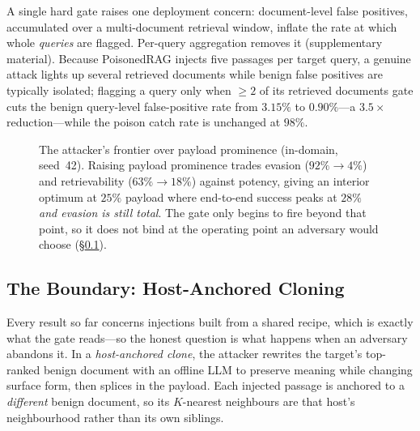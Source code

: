\documentclass[conference]{IEEEtran}
\begin{document}
A single hard gate raises one deployment concern: document-level false positives,
accumulated over a multi-document retrieval window, inflate the rate at which whole
\emph{queries} are flagged. Per-query aggregation removes it (supplementary material).
Because PoisonedRAG injects five passages per target query, a genuine
attack lights up several retrieved documents while benign false positives are
typically isolated; flagging a query only when $\geq\!2$ of its retrieved documents
gate cuts the benign query-level false-positive rate from $3.15\%$ to
$0.90\%$---a $3.5\times$ reduction---while the poison catch rate is unchanged at
$98\%$.

\begin{figure}[t]
\centering
{}
\caption{The attacker's frontier over payload prominence (in-domain, seed~42). Raising payload
prominence trades evasion ($92\%\!\to\!4\%$) and retrievability ($63\%\!\to\!18\%$) against
potency, giving an interior optimum at $25\%$ payload where end-to-end success peaks at $28\%$
\emph{and evasion is still total}. The gate only begins to fire beyond that point, so it does
not bind at the operating point an adversary would choose (\S\ref{subsec:boundary}).}
\label{fig:frontier}
\end{figure}

\subsection{The Boundary: Host-Anchored Cloning}
\label{subsec:boundary}
Every result so far concerns injections built from a shared recipe, which is exactly what the
gate reads---so the honest question is what happens when an adversary abandons it. In a
\emph{host-anchored clone}, the attacker rewrites the target's top-ranked benign document with an
offline LLM to preserve meaning while changing surface form, then splices in the payload. Each
injected passage is anchored to a \emph{different} benign document, so its $K$-nearest
neighbours are that host's neighbourhood rather than its own siblings.
\end{document}
